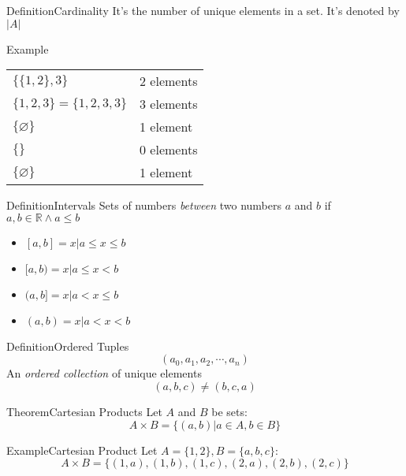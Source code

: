 \documentclass{MathNotes}
\newenvironment{example}[1]{\begin{BlueBox}{Example}{#1}}{\end{BlueBox}}
\newenvironment{definition}[1]{\begin{RedBox}{Definition}{#1}}{\end{RedBox}}
\newenvironment{theorem}[1]{\begin{GrayBox}{Theorem}{#1}}{\end{GrayBox}}
\begin{document}
\begin{multicols}{2}
	\begin{definition}{Cardinality}\label{def:cardinality}
		It's the number of unique elements in a set. It's denoted by $\bigl|A\bigr|$
	\end{definition}
	\begin{example}{}\label{ex:cardinality}
		\begin{tabular}{ll}
			$\big\{\{1, 2\}, 3\big\}$ & 2 elements \\
			$\{1,2,3\}=\{1,2,3,3\}$   & 3 elements \\
			$\{\varnothing\}$         & 1 element  \\
			$\{\}$                    & 0 elements \\
			$\{\varnothing\}$         & 1 element
		\end{tabular}
	\end{example}
	\begin{definition}{Intervals}\label{def:intervals}
		Sets of numbers \textit{between} two numbers $a$ and $b$ if
		$a,b\in\mathbb{R}\land a\leq b$
		\begin{itemize}
			\item $[a, b]=x\big|a\leq x\leq b$
			\item $[a, b)=x\big|a\leq x < b$
			\item $(a, b]=x\big|a < x\leq b$
			\item $(a, b)=x\big|a < x < b$
		\end{itemize}
	\end{definition}
\end{multicols}

\newpage
\begin{multicols}{2}
	\begin{definition}{Ordered Tuples}\label{def:ordered-tuples}
		\[(a_0,a_1,a_2,\cdots,a_n)\]
		An \textit{ordered collection} of unique elements
		\[(a,b,c)\neq(b,c,a)\]
	\end{definition}
	\begin{theorem}{Cartesian Products}\label{th:cartesian-products}
		Let $A$ and $B$ be sets:\[A\times B=\{(a,b)\big|a\in A,b\in B\}\]
	\end{theorem}
\end{multicols}
\begin{example}{Cartesian Product}
	Let $A=\{1,2\},B=\{a,b,c\}$:
	\[A\times B=\{(1,a),(1,b),(1,c),(2,a),(2,b),(2,c)\}\]
\end{example}
\end{document}
